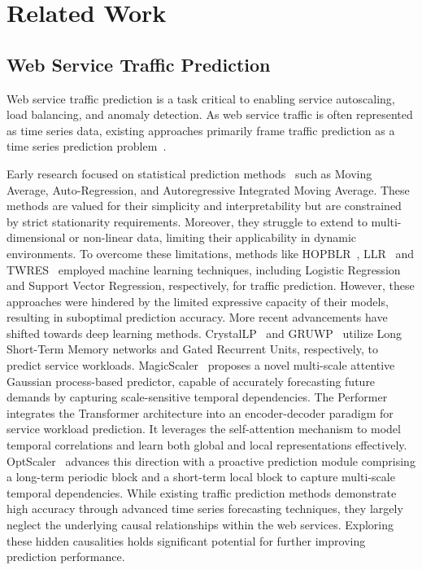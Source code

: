 \section{Related Work}
\subsection{Web Service Traffic Prediction}
Web service traffic prediction is a task critical to enabling service autoscaling, load balancing, and anomaly detection. As web service traffic is often represented as time series data, existing approaches primarily frame traffic prediction as a time series prediction problem~\cite{pan2023magicscaler,zou2024optscaler,alharthi2024auto}.

Early research focused on statistical prediction methods~\cite{kapgate2014weighted, hu2016autoscaling, kumar2016forecasting} such as Moving Average, Auto-Regression, and Autoregressive Integrated Moving Average. These methods are valued for their simplicity and interpretability but are constrained by strict stationarity requirements. Moreover, they struggle to extend to multi-dimensional or non-linear data, limiting their applicability in dynamic environments.
To overcome these limitations, methods like HOPBLR~\cite{issa2017using}, LLR~\cite{daraghmeh2018linear} and TWRES~\cite{hu2019stream} employed machine learning techniques, including Logistic Regression and Support Vector Regression, respectively, for traffic prediction. However, these approaches were hindered by the limited expressive capacity of their models, resulting in suboptimal prediction accuracy.
More recent advancements have shifted towards deep learning methods. CrystalLP~\cite{ruan2023workload} and GRUWP~\cite{guo2018applying} utilize Long Short-Term Memory networks and Gated Recurrent Units, respectively, to predict service workloads. 
MagicScaler~\cite{pan2023magicscaler} proposes a novel multi-scale attentive Gaussian process-based predictor, capable of accurately forecasting future demands by capturing scale-sensitive temporal dependencies. 
The Performer~\cite{qi2022performer} integrates the Transformer architecture into an encoder-decoder paradigm for service workload prediction. It leverages the self-attention mechanism to model temporal correlations and learn both global and local representations effectively.
OptScaler~\cite{zou2024optscaler} advances this direction with a proactive prediction module comprising a long-term periodic block and a short-term local block to capture multi-scale temporal dependencies. 
While existing traffic prediction methods demonstrate high accuracy through advanced time series forecasting techniques, they largely neglect the underlying causal relationships within the web services. Exploring these hidden causalities holds significant potential for further improving prediction performance.

